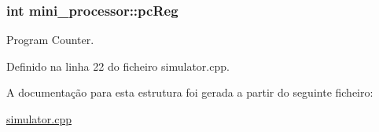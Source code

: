 \hypertarget{structmini__processor_aac30fbd95b117116b55aa77b9200c2c1}{
\subsubsection[{pc\-Reg}]{\setlength{\rightskip}{0pt plus 5cm}int mini\-\_\-processor\-::pc\-Reg}}\label{structmini__processor_aac30fbd95b117116b55aa77b9200c2c1}


Program Counter. 



Definido na linha 22 do ficheiro simulator.\-cpp.



A documentação para esta estrutura foi gerada a partir do seguinte ficheiro\-:\begin{DoxyCompactItemize}
\item 
\hyperlink{simulator_8cpp}{simulator.\-cpp}\end{DoxyCompactItemize}
